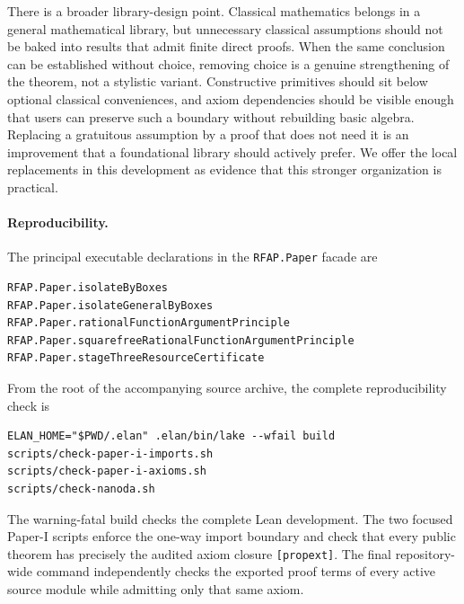 \documentclass[11pt]{article}
\begin{document}
There is a broader library-design point.  Classical mathematics belongs in a
general mathematical library, but unnecessary classical assumptions should
not be baked into results that admit finite direct proofs.  When the same
conclusion can be established without choice, removing choice is a genuine
strengthening of the theorem, not a stylistic variant.  Constructive
primitives should sit below optional classical conveniences, and axiom
dependencies should be visible enough that users can preserve such a
boundary without rebuilding basic algebra.  Replacing a gratuitous
assumption by a proof that does not need it is an improvement that a
foundational library should actively prefer.  We offer the local replacements
in this development as evidence that this stronger organization is
practical.

\newpage
\paragraph{Reproducibility.}
The principal executable declarations in the \texttt{RFAP.Paper} facade are
\begin{verbatim}
RFAP.Paper.isolateByBoxes
RFAP.Paper.isolateGeneralByBoxes
RFAP.Paper.rationalFunctionArgumentPrinciple
RFAP.Paper.squarefreeRationalFunctionArgumentPrinciple
RFAP.Paper.stageThreeResourceCertificate
\end{verbatim}
From the root of the accompanying source archive, the complete reproducibility
check is
\begin{verbatim}
ELAN_HOME="$PWD/.elan" .elan/bin/lake --wfail build
scripts/check-paper-i-imports.sh
scripts/check-paper-i-axioms.sh
scripts/check-nanoda.sh
\end{verbatim}
The warning-fatal build checks the complete Lean development.  The two focused
Paper-I scripts enforce the one-way import boundary and check that every public
theorem has precisely the audited axiom closure \texttt{[propext]}.  The final
repository-wide command independently checks the exported proof terms of every
active source module while admitting only that same axiom.
\end{document}
